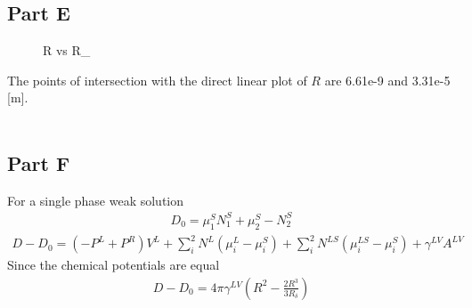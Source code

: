 \documentclass{article}
\begin{document}
\subsection*{Part E}
\begin{figure}%
\begin{center}
\renewcommand{\figure}{Fig.}
\caption{R vs R_\delta}
\end{center}
\end{figure}
The points of intersection with the direct linear plot of $R$ are
6.61e-9 and 3.31e-5 [m].
\\
\\
\subsection*{Part F}
For a single phase weak solution
\begin{align*}
D_0=\mu^S_1N^S_1+\mu^S_2-N^S_2
\end{align*}
\begin{align*}
D-D_0=(-P^L+P^R)V^L+\sum^2_iN^L(\mu^L_i-\mu^S_i)+\sum^2_iN^{LS}(\mu^{LS}_i-\mu^S_i)+\gamma^{LV}A^{LV}
\end{align*}
Since the chemical potentials are equal
\begin{align*}
D-D_0=4\pi \gamma^{LV}(R^2-\frac{2R^3}{3R_\delta})
\end{align*}
\end{document}
